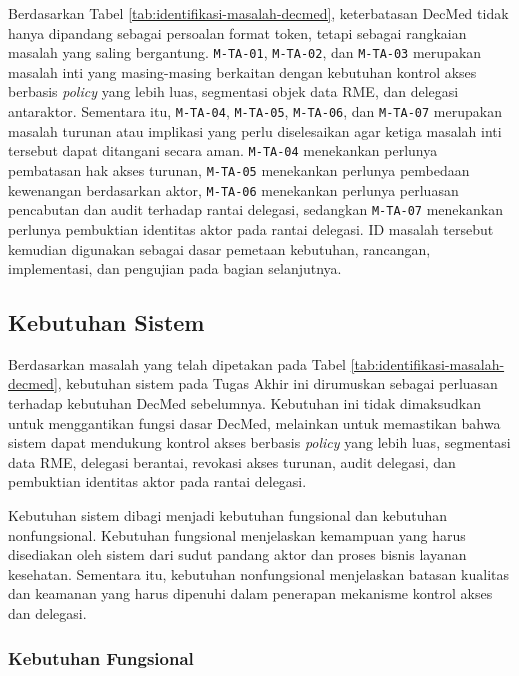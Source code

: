 \documentclass[bahasa, 12pt, a4paper, onecolumn, oneside, final]{report}
\begin{document}
Berdasarkan Tabel \ref{tab:identifikasi-masalah-decmed}, keterbatasan DecMed tidak hanya dipandang sebagai persoalan format token, tetapi sebagai rangkaian masalah yang saling bergantung. \texttt{M-TA-01}, \texttt{M-TA-02}, dan \texttt{M-TA-03} merupakan masalah inti yang masing-masing berkaitan dengan kebutuhan kontrol akses berbasis \textit{policy} yang lebih luas, segmentasi objek data RME, dan delegasi antaraktor. Sementara itu, \texttt{M-TA-04}, \texttt{M-TA-05}, \texttt{M-TA-06}, dan \texttt{M-TA-07} merupakan masalah turunan atau implikasi yang perlu diselesaikan agar ketiga masalah inti tersebut dapat ditangani secara aman. \texttt{M-TA-04} menekankan perlunya pembatasan hak akses turunan, \texttt{M-TA-05} menekankan perlunya pembedaan kewenangan berdasarkan aktor, \texttt{M-TA-06} menekankan perlunya perluasan pencabutan dan audit terhadap rantai delegasi, sedangkan \texttt{M-TA-07} menekankan perlunya pembuktian identitas aktor pada rantai delegasi. ID masalah tersebut kemudian digunakan sebagai dasar pemetaan kebutuhan, rancangan, implementasi, dan pengujian pada bagian selanjutnya.

\subsection{Kebutuhan Sistem}
\label{subsec:kebutuhan-sistem}

Berdasarkan masalah yang telah dipetakan pada Tabel \ref{tab:identifikasi-masalah-decmed}, kebutuhan sistem pada Tugas Akhir ini dirumuskan sebagai perluasan terhadap kebutuhan DecMed sebelumnya. Kebutuhan ini tidak dimaksudkan untuk menggantikan fungsi dasar DecMed, melainkan untuk memastikan bahwa sistem dapat mendukung kontrol akses berbasis \textit{policy} yang lebih luas, segmentasi data RME, delegasi berantai, revokasi akses turunan, audit delegasi, dan pembuktian identitas aktor pada rantai delegasi.

Kebutuhan sistem dibagi menjadi kebutuhan fungsional dan kebutuhan nonfungsional. Kebutuhan fungsional menjelaskan kemampuan yang harus disediakan oleh sistem dari sudut pandang aktor dan proses bisnis layanan kesehatan. Sementara itu, kebutuhan nonfungsional menjelaskan batasan kualitas dan keamanan yang harus dipenuhi dalam penerapan mekanisme kontrol akses dan delegasi.

\subsubsection{Kebutuhan Fungsional}
\label{subsubsec:kebutuhan-fungsional}
\end{document}
